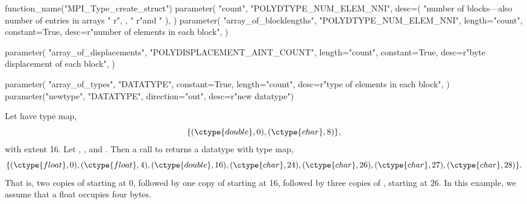 %
\begin{mpi-binding}
    function_name("MPI_Type_create_struct")
    parameter(
        "count",
        "POLYDTYPE_NUM_ELEM_NNI",
        desc=(
            "number of blocks---also number of entries in arrays "
            r", , "
            r"and "
        ),
    )
    parameter(
        "array_of_blocklengths",
        "POLYDTYPE_NUM_ELEM_NNI",
        length="count",
        constant=True,
        desc=r"number of elements in each block",
    )

    parameter(
        "array_of_displacements",
        "POLYDISPLACEMENT_AINT_COUNT",
        length="count",
        constant=True,
        desc=r"byte displacement of each block",
    )

    parameter(
        "array_of_types",
        "DATATYPE",
        constant=True,
        length="count",
        desc=r"type of elements in each block",
    )
    parameter("newtype", "DATATYPE", direction="out", desc=r"new datatype")
\end{mpi-binding}

\begin{example}
\label{pt2pt-exV}
%
%
Let  have type map,
\[
\{ (\ctype{double}, 0), (\ctype{char}, 8) \} ,
\]
with extent 16.
Let , ,
and .  Then a call to
 returns
a datatype with type map,
\begin{displaymath}
\{
(\ctype{float}, 0), (\ctype{float}, 4), (\ctype{double}, 16), (\ctype{char},
24), (\ctype{char}, 26), (\ctype{char}, 27), (\ctype{char}, 28)
\} .
\end{displaymath}
That is, two copies of  starting at 0, followed by
one copy of  starting at 16, followed by three copies of
, starting at 26.
In this example, we assume that a float occupies four bytes.
\end{example}

